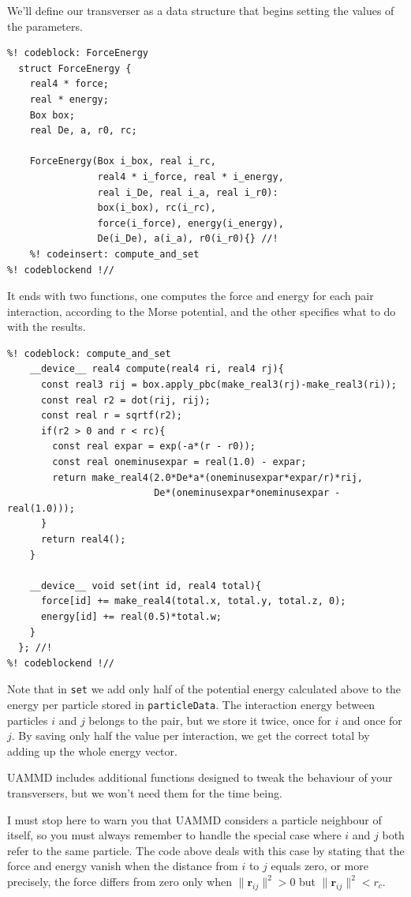 We'll define our transverser as a data structure that begins setting the values
of the parameters.
\begin{lstlisting}
%! codeblock: ForceEnergy
  struct ForceEnergy {
    real4 * force;
    real * energy;
    Box box;
    real De, a, r0, rc;

    ForceEnergy(Box i_box, real i_rc,
                real4 * i_force, real * i_energy,
                real i_De, real i_a, real i_r0):
                box(i_box), rc(i_rc),
                force(i_force), energy(i_energy),
                De(i_De), a(i_a), r0(i_r0){} //!
    %! codeinsert: compute_and_set
%! codeblockend !//
\end{lstlisting}
It ends with two functions, one computes the force and energy for each pair 
interaction, according to the Morse potential, and the other specifies what to 
do with the results.
\begin{lstlisting}
%! codeblock: compute_and_set
    __device__ real4 compute(real4 ri, real4 rj){
      const real3 rij = box.apply_pbc(make_real3(rj)-make_real3(ri));
      const real r2 = dot(rij, rij);
      const real r = sqrtf(r2);
      if(r2 > 0 and r < rc){
        const real expar = exp(-a*(r - r0));
        const real oneminusexpar = real(1.0) - expar;
        return make_real4(2.0*De*a*(oneminusexpar*expar/r)*rij,
                          De*(oneminusexpar*oneminusexpar - real(1.0)));
      }
      return real4();
    }

    __device__ void set(int id, real4 total){
      force[id] += make_real4(total.x, total.y, total.z, 0);
      energy[id] += real(0.5)*total.w;
    }
  }; //!
%! codeblockend !//
\end{lstlisting}
Note that in \texttt{set} we add only half of the potential energy calculated 
above to the energy per particle stored in \texttt{particleData}. The 
interaction energy between particles $i$ and $j$ belongs to the pair, but
we store it twice, once for $i$ and once for $j$. By saving only half the value 
per interaction, we get the correct total by adding up the whole energy vector.

UAMMD includes additional functions designed to tweak the behaviour of your 
transversers, but we won't need them for the time being.

I must stop here to warn you that UAMMD considers a particle neighbour of 
itself, so you must always remember to handle the special case where $i$ and $j$ 
both refer to the same particle. The code above deals with this case by stating 
that the force and energy vanish when the distance from $i$ to $j$ equals zero, 
or more precisely, the force differs from zero only when $\|\mathbf{r}_{ij}\|^2 
> 0$ but $\|\mathbf{r}_{ij}\|^2 < r_c$.

